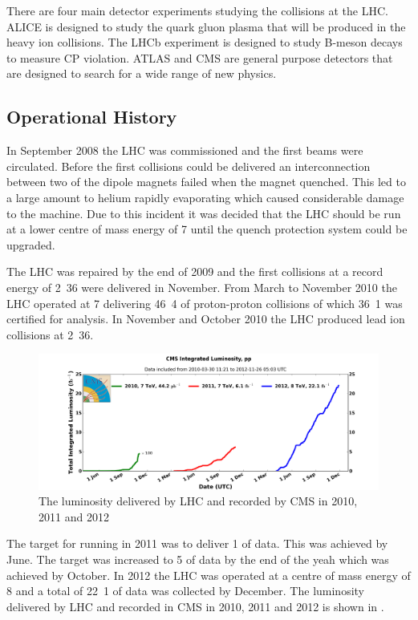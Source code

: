 There are four main detector experiments studying the collisions at the
\ac{LHC}.  \acf{ALICE} is designed to study the quark gluon plasma that will be
produced in the heavy ion collisions.  The \acf{LHCb} experiment is designed to
study B-meson decays to measure CP violation.  \acf{ATLAS} and \acf{CMS} are
general purpose detectors that are designed to search for a wide range of new
physics\cite{lhc}.

\subsection{Operational History}
In September 2008 the \ac{LHC} was commissioned and the first beams were circulated.
Before the first collisions could be delivered an interconnection
between two of the dipole magnets failed when the magnet quenched.
This led to a large amount to helium rapidly evaporating which caused
considerable damage to the machine.
Due to this incident it was decided that the \ac{LHC} should be run at a lower centre
of mass energy of \unit{7}{\TeV} until the quench protection system could be
upgraded.

The \ac{LHC} was repaired by the end of 2009 and the first collisions at a record
energy of \unit{2.36}{\TeV} were delivered in November. 
From March to November 2010 the \ac{LHC} operated at \unit{7}{\TeV} delivering
\unit{46.4}{\invpb} of proton-proton collisions of which \unit{36.1}{\invpb} was
certified for analysis.
In November and October 2010 the \ac{LHC} produced lead ion collisions at
\unit{2.36}{\TeV}.

\begin{figure}[htbp]
  \centering
  \includegraphics[width=\textwidth]{int_lumi_cumulative_pp_1.png}
  \caption{The luminosity delivered by LHC and recorded by CMS in 2010, 2011 and 2012}
  \label{fig:LHC2010}
\end{figure}

The target for running in 2011 was to deliver \unit{1}{\invfb} of data. This was
achieved by June. The target was increased to \unit{5}{\invfb} of data by the end
of the yeah which was achieved by October. 
In 2012 the \ac{LHC} was operated at a centre of mass energy of \unit{8}{\TeV}
and a total of \unit{22.1}{\invfb} of data was collected by December.
The luminosity delivered by LHC and recorded in CMS in 2010, 2011 and 2012 is
shown in .

